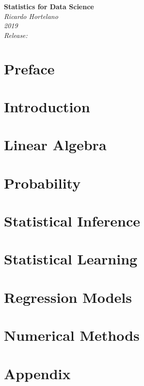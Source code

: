 \documentclass[12pt]{book}
\begin{document}
\begin{titlepage}
    \begin{center}
       \Large\textbf{Statistics for Data Science}\\
       \large\textit{Ricardo Hortelano}\\
       \textit{2019}\\
       \vspace*{3\baselineskip}
       \textit{Release:}\\
       \textit{}
    \end{center}
 \end{titlepage}

\listoftodos
\tableofcontents

\chapter*{Preface}


\chapter*{Introduction}


\chapter{Linear Algebra}


\chapter{Probability}


\chapter{Statistical Inference}


\chapter{Statistical Learning}


\chapter{Regression Models}


\chapter{Numerical Methods}


\appendix
\chapter{Appendix}


\printbibliography
\end{document}
